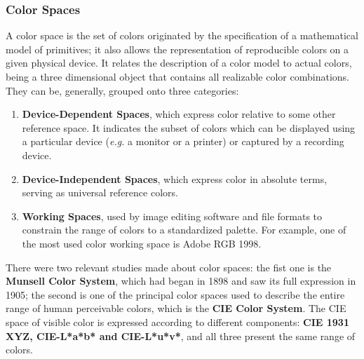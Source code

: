 \documentclass{report}
\begin{document}
\subsubsection{Color Spaces}
A color space is the set of colors originated by the specification of a mathematical model of primitives; it also
allows the representation of reproducible colors on a given physical device. It relates the description
of a color model to actual colors, being a three dimensional object that contains all realizable color
combinations. They can be, generally, grouped onto three categories:
	\begin{enumerate}
	\item \textbf{Device-Dependent Spaces}, which express color relative to some other reference space. It
    indicates the subset of colors which can be displayed using a particular device (\emph{e.g.} a monitor or a
    printer) or captured by a recording device.
	\item \textbf{Device-Independent Spaces}, which express color in absolute terms, serving as universal
    reference colors.
	\item \textbf{Working Spaces}, used by image editing software and file formats to constrain the range of
    colors to a standardized palette. For example, one of the most used color working space is Adobe RGB 1998.
	\end{enumerate} \par
There were two relevant studies made about color spaces: the fist one is the \textbf{Munsell Color System},
which had began in 1898 and saw its full expression in 1905; the second is one of the principal color spaces used to describe the
entire range of human perceivable colors, which is the \textbf{CIE Color System}. The CIE space of visible color is expressed
according to different components: \textbf{CIE 1931 XYZ, CIE-L*a*b* and CIE-L*u*v*}, and all three present the same range of colors.
%
\end{document}
